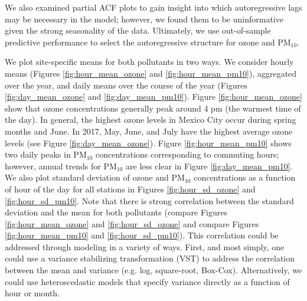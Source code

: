 \documentclass[alpha-refs]{wiley-article}
\begin{document}
\vspace{-3mm}
We also examined partial ACF plots to gain insight into which autoregressive lags may be necessary in the model; however, we found them to be uninformative given the strong seasonality of the data. Ultimately, we use out-of-sample predictive performance to select the autoregressive structure for ozone and $\text{PM}_{10}$.

We plot site-specific means for both pollutants in two ways.  We consider hourly means (Figures \ref{fig:hour_mean_ozone} and \ref{fig:hour_mean_pm10}), aggregated over the year, and daily means over the course of the year (Figures \ref{fig:day_mean_ozone} and \ref{fig:day_mean_pm10}). Figure \ref{fig:hour_mean_ozone} show that ozone concentrations generally peak around 4 pm (the warmest time of the day). In general, the highest ozone levels in Mexico City occur during spring months and June. In 2017, May, June, and July have the highest average ozone levels (see Figure \ref{fig:day_mean_ozone}). Figure \ref{fig:hour_mean_pm10} shows two daily peaks in $\text{PM}_{10}$ concentrations corresponding to commuting hours; however, annual trends for $\text{PM}_{10}$ are less clear in Figure \ref{fig:day_mean_pm10}.
We also plot standard deviation of ozone and $\text{PM}_{10}$ concentrations as a function of hour of the day for all stations in Figures \ref{fig:hour_sd_ozone} and \ref{fig:hour_sd_pm10}. Note that there is strong correlation between the standard deviation and the mean for both pollutants (compare Figures \ref{fig:hour_mean_ozone} and \ref{fig:hour_sd_ozone} and compare Figures \ref{fig:hour_mean_pm10} and \ref{fig:hour_sd_pm10}). This correlation could be addressed through modeling in a variety of ways. First, and most simply, one could use a variance stabilizing transformation (VST) to address the correlation between the mean and variance (e.g. log, square-root, Box-Cox). Alternatively, we could use heteroscedastic models that specify variance directly as a function of hour or month.
\vspace{-3mm}
\end{document}
